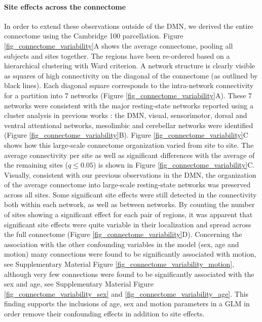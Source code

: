 \documentclass[authoryear]{elsarticle}
\begin{document}
\paragraph{Site effects across the connectome} In order to extend these
observations outside of the DMN, we derived the entire connectome using the
Cambridge 100 parcellation. Figure \ref{fig_connectome_variability}A shows the
average connectome, pooling all subjects and sites together. The regions have
been re-ordered based on a hierarchical clustering with Ward criterion. A
network structure is clearly visible as squares of high connectivity on the
diagonal of the connectome (as outlined by black lines). Each diagonal square
corresponds to the intra-network connectivity for a partition into 7 networks (Figure \ref{fig_connectome_variability}A). These 7 networks were
consistent with the major resting-state networks reported using a cluster
analysis in previous works \citep[e.g.][]{Heuvel2008, Bellec2010, Yeo2011,
Power2011}: the DMN, visual, sensorimotor, dorsal and ventral attentional
networks, mesolimbic and cerebellar networks were
identified (Figure \ref{fig_connectome_variability}B). Figure \ref{fig_connectome_variability}C shows how this large-scale
connectome organization varied from site to site. The average connectivity per
site as well as significant differences with the average of the remaining sites
($q\leq 0.05$) is shown in Figure \ref{fig_connectome_variability}C.
Visually, consistent with our previous observations in the DMN, the organization
of the average connectome into large-scale resting-state networks was preserved
across all sites. 
Some significant site effects were still detected in the connectivity both within each network, as well as between networks. By counting the number of sites showing a significant effect for each pair of regions, it was apparent that significant site effects were quite variable in their localization and spread across the full connectome (Figure \ref{fig_connectome_variability}D). 
Concerning the association with the other confounding variables in the model (sex, age and motion) many connections were found to be significantly associated with motion, see Supplementary Material Figure \ref{fig_connectome_variability_motion}, although very few connections were found to be significantly associated with the sex and age, see Supplementary Material Figure \ref{fig_connectome_variability_sex} and \ref{fig_connectome_variability_age}. This finding supports the inclusions of age, sex and motion parameters in a GLM in order remove their confounding effects in addition to site effects.
\end{document}
